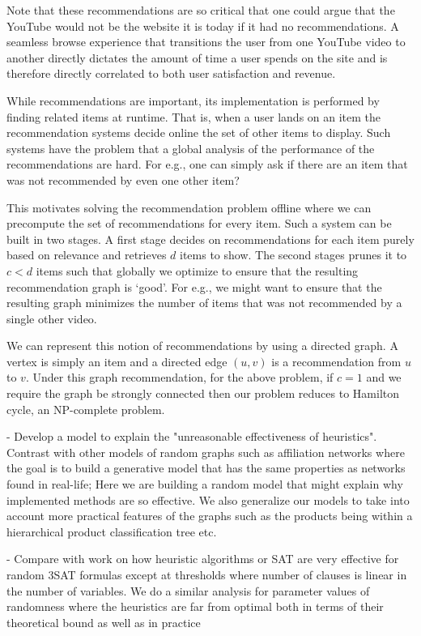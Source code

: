 Note that these recommendations are so critical that one could argue that the YouTube
would not be the website it is today if it had no recommendations. A seamless
browse experience that transitions the user from one YouTube video to another directly
dictates the amount of time a user spends on the site and is therefore directly correlated
to both user satisfaction and revenue. \vs

While recommendations are important, its implementation is performed by finding related
items at runtime. That is, when a user lands on an item the recommendation systems
decide online the set of other items to display. Such systems have the problem that
a global analysis of the performance of the recommendations are hard. For e.g., one
can simply ask if there are an item that was not recommended by even one other item? \vs

This motivates solving the recommendation problem offline where we can precompute
the set of recommendations for every item. Such a system can be built in two stages.
A first stage decides on recommendations for each item purely based on relevance and
retrieves $d$ items to show. The second stages prunes it to $c < d$ items such that
globally we optimize to ensure that the resulting recommendation graph is `good'. For
e.g., we might want to ensure that the resulting graph minimizes the number of items
that was not recommended by a single other video. \vs

We can represent this notion of recommendations by using a directed graph. A vertex is simply
an item and a directed edge $(u, v)$ is a recommendation from $u$ to $v$. Under this graph
recommendation, for the above problem, if $c=1$ and we require the graph be strongly
connected then our problem reduces to Hamilton cycle, an NP-complete problem. \vs


- Develop a model to explain the "unreasonable effectiveness of heuristics". Contrast with other models of random graphs such as affiliation networks where the goal is to build a generative model that has the same properties as networks found in real-life; Here we are building a random model that might explain why implemented methods are so effective. We also generalize our models to take into account more practical features of the graphs such as the products being within a hierarchical product classification tree etc.

- Compare with work on how heuristic algorithms or SAT are very effective for random 3SAT formulas except at thresholds where number of clauses is linear in the number of variables. We do a similar analysis for parameter values of randomness where the heuristics are far from optimal both in terms of their theoretical bound as well as in practice

